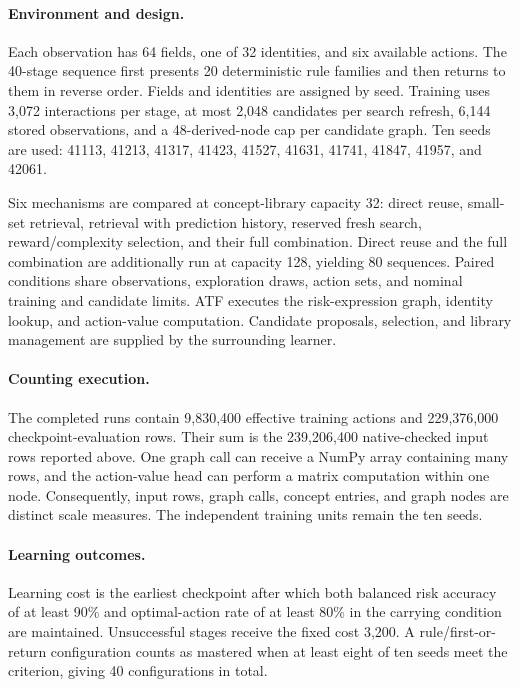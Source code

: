 \paragraph{Environment and design.}
Each observation has 64 fields, one of 32 identities, and six available actions.
The 40-stage sequence first presents 20 deterministic rule families and then
returns to them in reverse order. Fields and identities are assigned by seed.
Training uses 3,072 interactions per stage, at most 2,048 candidates per search
refresh, 6,144 stored observations, and a 48-derived-node cap per candidate
graph. Ten seeds are used:
41113, 41213, 41317, 41423, 41527, 41631, 41741, 41847, 41957, and 42061.

Six mechanisms are compared at concept-library capacity 32: direct reuse,
small-set retrieval, retrieval with prediction history, reserved fresh search,
reward/complexity selection, and their full combination. Direct reuse and the
full combination are additionally run at capacity 128, yielding 80 sequences.
Paired conditions share observations, exploration draws, action sets, and
nominal training and candidate limits. ATF executes the risk-expression graph,
identity lookup, and action-value computation. Candidate proposals, selection,
and library management are supplied by the surrounding learner.

\paragraph{Counting execution.}
The completed runs contain 9,830,400 effective training actions and 229,376,000
checkpoint-evaluation rows. Their sum is the 239,206,400 native-checked input
rows reported above. One graph call can receive a NumPy array containing many
rows, and the action-value head can perform a matrix computation within one
node. Consequently, input rows, graph calls, concept entries, and graph nodes
are distinct scale measures. The independent training units remain the ten
seeds.

\paragraph{Learning outcomes.}
Learning cost is the earliest checkpoint after which both balanced risk accuracy
of at least 90\% and optimal-action rate of at least 80\% in the carrying
condition are maintained. Unsuccessful stages receive the fixed cost 3,200.
A rule/first-or-return configuration counts as mastered when at least eight
of ten seeds meet the criterion, giving 40 configurations in total.

